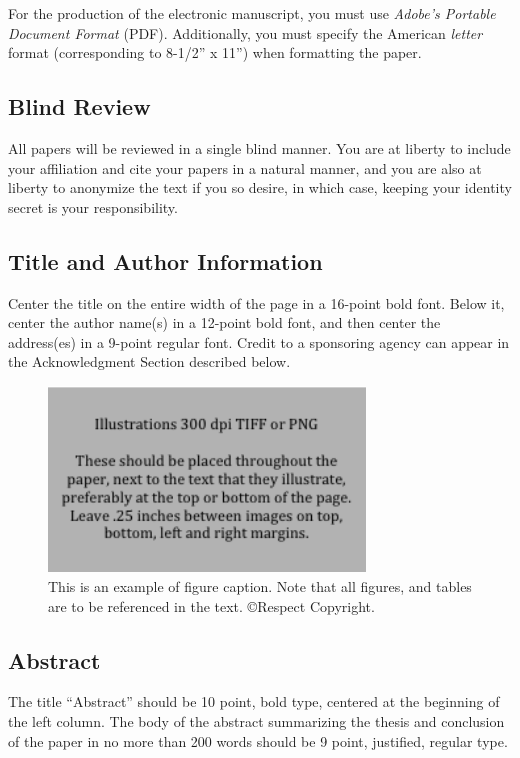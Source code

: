 \documentclass[letterpaper]{article}
\begin{document}
For the production of the electronic manuscript, you must use {\em Adobe's Portable Document Format} (PDF). Additionally, you must specify the American {\em letter} format (corresponding to 8-1/2'' x 11'') when formatting the paper.

\subsection{Blind Review}

All papers will be reviewed in a single blind manner.  You are at liberty to include your affiliation and cite your papers in a natural manner, and you are also at liberty to anonymize the text if you so desire, in which case, keeping your identity secret is your responsibility.

\subsection{Title and Author Information}

Center the title on the entire width of the page in a 16-point bold font. Below it, center the author name(s) in a 12-point bold font, and then center the address(es) in a 9-point regular font. Credit to a sponsoring agency can appear in the Acknowledgment Section described below.

\begin{figure}[h]
\includegraphics[width=3.31in]{figure.png}
\caption{This is an example of figure caption. Note that all figures, and tables are to be referenced in the text. \copyright Respect Copyright.}
\end{figure}

\subsection{Abstract}

The title ``Abstract'' should be 10 point, bold type, centered at the beginning of the left column. The body of the abstract summarizing the thesis and conclusion of the paper in no more than 200 words should be 9 point, justified, regular type.
\end{document}
